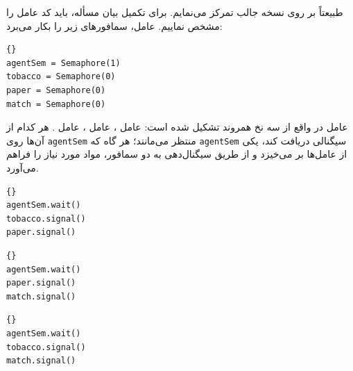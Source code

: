 \documentclass{book}
\begin{document}
    طبیعتاً بر روی نسخه جالب تمرکز می‌نمایم. برای تکمیل بیان مسأله، باید کد عامل را مشخص نماییم. عامل، سمافورهای زیر را بکار می‌برد:

\begin{latin}
\begin{lstlisting}[title=\rl{سمافورهای عامل}]{}
agentSem = Semaphore(1)
tobacco = Semaphore(0)
paper = Semaphore(0)
match = Semaphore(0)
\end{lstlisting}
\end{latin}

    عامل در واقع از سه نخ همروند تشکیل شده است:  عامل ،  عامل ،  عامل .
    هر کدام از آن‌ها روی {\tt agentSem} منتظر می‌مانند؛ هر گاه که {\tt agentSem} سیگنالی دریافت کند، یکی از عامل‌ها بر می‌خیزد و 
    از طریق سیگنال‌دهی به دو سمافور، مواد مورد نیاز را فراهم می‌آورد. 

\begin{latin}
\begin{lstlisting}[title=\rl{کد عامل \lr{A}}]{}
agentSem.wait()
tobacco.signal()
paper.signal()
\end{lstlisting}
\end{latin}


\begin{latin}
\begin{lstlisting}[title=\rl{کد عامل \lr{B}}]{}
agentSem.wait()
paper.signal()
match.signal()
\end{lstlisting}
\end{latin}

\begin{latin}
\begin{lstlisting}[title=\rl{کد عامل \lr{C}}]{}
agentSem.wait()
tobacco.signal()
match.signal()
\end{lstlisting}
\end{latin}
\end{document}

